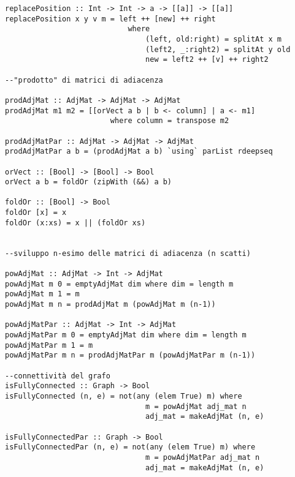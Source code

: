 \begin{verbatim}
replacePosition :: Int -> Int -> a -> [[a]] -> [[a]]                            
replacePosition x y v m = left ++ [new] ++ right
                            where
                                (left, old:right) = splitAt x m
                                (left2, _:right2) = splitAt y old
                                new = left2 ++ [v] ++ right2

--"prodotto" di matrici di adiacenza
                        
prodAdjMat :: AdjMat -> AdjMat -> AdjMat
prodAdjMat m1 m2 = [[orVect a b | b <- column] | a <- m1]
                        where column = transpose m2
    
prodAdjMatPar :: AdjMat -> AdjMat -> AdjMat
prodAdjMatPar a b = (prodAdjMat a b) `using` parList rdeepseq
                        
orVect :: [Bool] -> [Bool] -> Bool
orVect a b = foldOr (zipWith (&&) a b)

foldOr :: [Bool] -> Bool
foldOr [x] = x
foldOr (x:xs) = x || (foldOr xs)

                
--sviluppo n-esimo delle matrici di adiacenza (n scatti)
                        
powAdjMat :: AdjMat -> Int -> AdjMat
powAdjMat m 0 = emptyAdjMat dim where dim = length m
powAdjMat m 1 = m
powAdjMat m n = prodAdjMat m (powAdjMat m (n-1))

powAdjMatPar :: AdjMat -> Int -> AdjMat
powAdjMatPar m 0 = emptyAdjMat dim where dim = length m
powAdjMatPar m 1 = m
powAdjMatPar m n = prodAdjMatPar m (powAdjMatPar m (n-1))

--connettività del grafo
isFullyConnected :: Graph -> Bool
isFullyConnected (n, e) = not(any (elem True) m) where    
                                m = powAdjMat adj_mat n
                                adj_mat = makeAdjMat (n, e)
                                
isFullyConnectedPar :: Graph -> Bool
isFullyConnectedPar (n, e) = not(any (elem True) m) where    
                                m = powAdjMatPar adj_mat n
                                adj_mat = makeAdjMat (n, e)
\end{verbatim}

